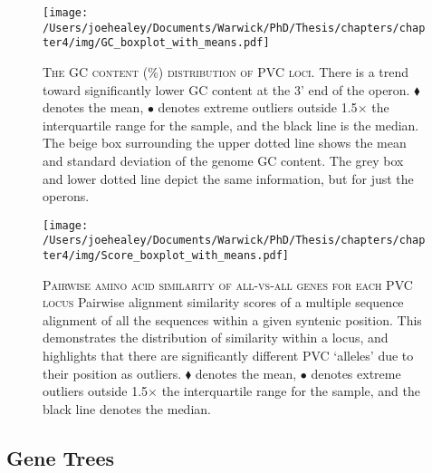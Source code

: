 \newpage
\begin{figure}[h!]
	\centering
	\texttt{[image: /Users/joehealey/Documents/Warwick/PhD/Thesis/chapters/chapter4/img/GC\_boxplot\_with\_means.pdf]}
	\captionsetup{singlelinecheck=off, justification=justified, font=footnotesize, aboveskip=10pt}
	\caption[GC Content of PVC Genes]{\textsc{\normalsize The GC content (\%) distribution of PVC loci.}\vspace{0.1cm} \newline There is a trend toward significantly lower GC content at the 3' end of the operon. $\blacklozenge$ denotes the mean, $\bullet$ denotes extreme outliers outside 1.5$\times$ the interquartile range for the sample, and the black line is the median. The beige box surrounding the upper dotted line shows the mean and standard deviation of the genome GC content. The grey box and lower dotted line depict the same information, but for just the operons.}
	\label{GC}
\end{figure}

\begin{figure}[h!]
	\centering
	\texttt{[image: /Users/joehealey/Documents/Warwick/PhD/Thesis/chapters/chapter4/img/Score\_boxplot\_with\_means.pdf]}
	\captionsetup{singlelinecheck=off, justification=justified, font=footnotesize, aboveskip=10pt}
	\caption[Pairwise Amino Acid Similarity Scores for PVC Proteins]{\textsc{\normalsize Pairwise amino acid similarity of all-vs-all genes for each PVC locus}\vspace{0.1cm} \newline Pairwise alignment similarity scores of a multiple sequence alignment of all the sequences within a given syntenic position. This demonstrates the distribution of similarity within a locus, and highlights that there are significantly different PVC `alleles' due to their position as outliers. $\blacklozenge$ denotes the mean, $\bullet$ denotes extreme outliers outside 1.5$\times$ the interquartile range for the sample, and the black line denotes the median.}
	\label{AAID}
\end{figure}


\newpage
\subsection{Gene Trees}

